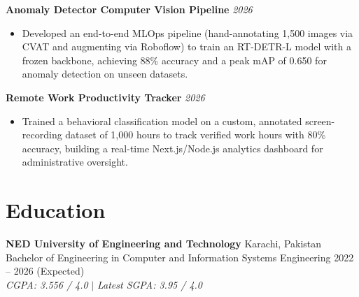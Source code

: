 \documentclass[11pt, a4paper]{article}
\begin{document}
\textbf{Anomaly Detector Computer Vision Pipeline} \hfill \textit{2026}
\begin{itemize}[leftmargin=0.25in, itemsep=2pt]
    \item Developed an end-to-end MLOps pipeline (hand-annotating 1,500 images via CVAT and augmenting via Roboflow) to train an RT-DETR-L model with a frozen backbone, achieving 88\% accuracy and a peak mAP of 0.650 for anomaly detection on unseen datasets.
\end{itemize}

\textbf{Remote Work Productivity Tracker} \hfill \textit{2026}
\begin{itemize}[leftmargin=0.25in, itemsep=2pt]
    \item Trained a behavioral classification model on a custom, annotated screen-recording dataset of 1,000 hours to track verified work hours with 80\% accuracy, building a real-time Next.js/Node.js analytics dashboard for administrative oversight.
\end{itemize}

\section*{Education}
\textbf{NED University of Engineering and Technology} \hfill Karachi, Pakistan \\
Bachelor of Engineering in Computer and Information Systems Engineering \hfill 2022 -- 2026 (Expected) \\
\textit{CGPA: 3.556 / 4.0} $|$ \textit{Latest SGPA: 3.95 / 4.0}
\end{document}
